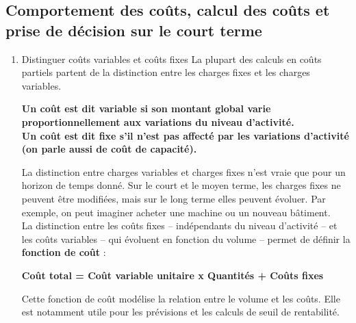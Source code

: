 \documentclass{tufte-handout}
\begin{document}
\subsection{Comportement des coûts, calcul des coûts et prise de décision sur le court terme}
\label{sec:orgfdbc560}
\begin{enumerate}
\item Distinguer coûts variables et coûts fixes
\label{sec:org963f0f6}
La plupart des calculs en coûts partiels partent de la distinction entre les charges fixes et les charges variables.\\
\begin{center}
\textbf{Un coût est dit variable si son montant global varie proportionnellement aux variations du niveau d'activité.}\\
\textbf{Un coût est dit fixe s'il n'est pas affecté par les variations d'activité (on parle aussi de coût de capacité).}\\
\end{center}
La distinction entre charges variables et charges fixes n'est vraie que pour un horizon de temps donné. Sur le court et le moyen terme, les charges fixes ne peuvent être modifiées, mais sur le long terme elles peuvent évoluer. Par exemple, on peut imaginer acheter une machine ou un nouveau bâtiment.\\
La distinction entre les coûts fixes – indépendants du niveau d'activité – et les coûts variables – qui évoluent en fonction du volume – permet de définir la \textbf{fonction de coût} :\\
\begin{center}
\textbf{Coût total = Coût variable unitaire x Quantités + Coûts fixes}\\
\end{center}
Cette fonction de coût modélise la relation entre le volume et les coûts. Elle est notamment utile pour les prévisions et les calculs de seuil de rentabilité.\\


\end{enumerate}
\end{document}
